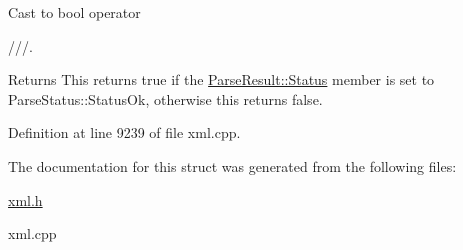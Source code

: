 Cast to bool operator \par
 ///. 

\begin{DoxyReturn}{Returns}
This returns true if the \hyperlink{structphys_1_1xml_1_1ParseResult_a1bf9dfeebdb07656723bbaf18ab612b5}{ParseResult::Status} member is set to ParseStatus::StatusOk, otherwise this returns false. 
\end{DoxyReturn}


Definition at line 9239 of file xml.cpp.



The documentation for this struct was generated from the following files:\begin{DoxyCompactItemize}
\item 
\hyperlink{xml_8h}{xml.h}\item 
xml.cpp\end{DoxyCompactItemize}
